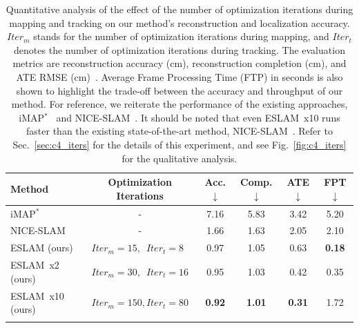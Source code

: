 \begin{table}[t]
    \begin{center}
        \begin{tabular}{l|c|ccc|c}
            \Xhline{2\arrayrulewidth}
            Method & Optimization Iterations & Acc.$\downarrow$ & Comp.$\downarrow$ & ATE$\downarrow$ & FPT$\downarrow$ \\
            
            \hline
            iMAP$^{*}$ & - & 7.16 & 5.83 & 3.42 & 5.20 \\
            NICE-SLAM & - & 1.66 & 1.63 & 2.05 & 2.10 \\
            
            \hline
            ESLAM (ours) & $Iter_{m}=15, \phantom{0} Iter_{t}=8\phantom{0}$  & 0.97 & 1.05  & 0.63 & \textbf{0.18} \\
            ESLAM~x2 (ours) & $Iter_{m}=30, \phantom{0} Iter_{t}=16$  & 0.95 & 1.03  & 0.42 & 0.35 \\
            ESLAM~x10 (ours) & $Iter_{m}=150, Iter_{t}=80$  & \textbf{0.92} & \textbf{1.01}  & \textbf{0.31} & 1.72 \\
            
            \Xhline{2\arrayrulewidth}
        \end{tabular}
    \end{center}
    \caption{Quantitative analysis of the effect of the number of optimization iterations during mapping and tracking on our method's reconstruction and localization accuracy. $Iter_{m}$ stands for the number of optimization iterations during mapping, and $Iter_{t}$ denotes the number of optimization iterations during tracking. The evaluation metrics are reconstruction accuracy (cm), reconstruction completion (cm), and ATE RMSE (cm)~\cite{sturm2012benchmark}. Average Frame Processing Time (FTP) in seconds is also shown to highlight the trade-off between the accuracy and throughput of our method. For reference, we reiterate the performance of the existing approaches, iMAP$^{*}$~\cite{sucar2021imap} and NICE-SLAM~\cite{zhu2022nice}. It should be noted that even ESLAM~x10 runs faster than the existing state-of-the-art method, NICE-SLAM~\cite{zhu2022nice}. Refer to Sec.~\ref{sec:c4_iters} for the details of this experiment, and see Fig.~\ref{fig:c4_iters} for the qualitative analysis.}
    \label{table:iters}
\end{table}

